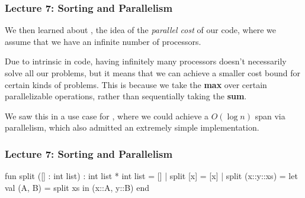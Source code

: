 \documentclass[aspectratio=169, handout]{beamer}
\begin{document}
{\begin{frame}[fragile]
{
  }
\end{frame}

\begin{frame}[fragile]
  \frametitle{Lecture 7: Sorting and Parallelism}

  We then learned about , the idea of the \textit{parallel cost}
  of our code, where we assume that we have an infinite number of processors.

  \pause
  \vspace{\fill}

  Due to intrinsic  in code, having infinitely
  many processors doesn't necessarily solve all our problems, but it
  means that we can achieve a smaller cost bound for certain kinds of problems.
  This is because we take the \textbf{max} over certain parallelizable
  operations, rather than sequentially taking the \textbf{sum}.

  \pause
  \vspace{\fill}

  We saw this in a use case for , where we could achieve a
  $O(\log n)$ span via parallelism, which also admitted an extremely
  simple implementation.
\end{frame}

\begin{frame}[fragile]
  \frametitle{Lecture 7: Sorting and Parallelism}

  {\tiny
  \begin{codeblock}
    fun split ([] : int list) : int list * int list = []
      | split [x] = [x]
      | split (x::y::xs) =
          let
            val (A, B) = split xs
          in
            (x::A, y::B)
          end


\end{codeblock}}
\end{frame}}
\end{document}
